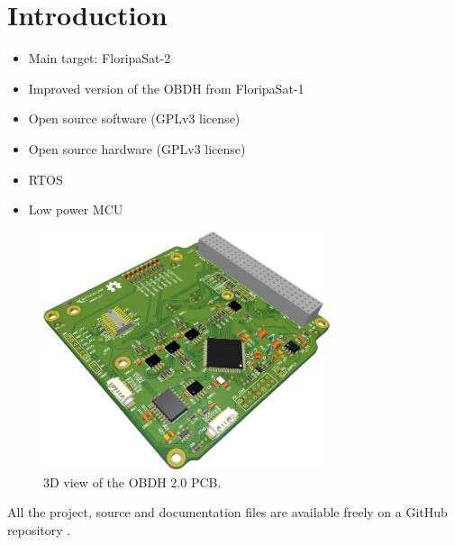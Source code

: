 %
%
%
%
%

%
%
%
%
%
%

\chapter{Introduction} \label{ch:introduction}

\begin{itemize}
    \item Main target: FloripaSat-2
    \item Improved version of the OBDH from FloripaSat-1
    \item Open source software (GPLv3 license)
    \item Open source hardware (GPLv3 license)
    \item RTOS
    \item Low power MCU
\end{itemize}

\begin{figure}[!ht]
    \begin{center}
        \includegraphics[width=0.75\textwidth]{figures/obdh2-pcb-3d.png}
        \caption{3D view of the OBDH 2.0 PCB.}
        \label{fig:pcb-3d}
    \end{center}
\end{figure}

All the project, source and documentation files are available freely on a GitHub repository \cite{obdh2-repo}.
